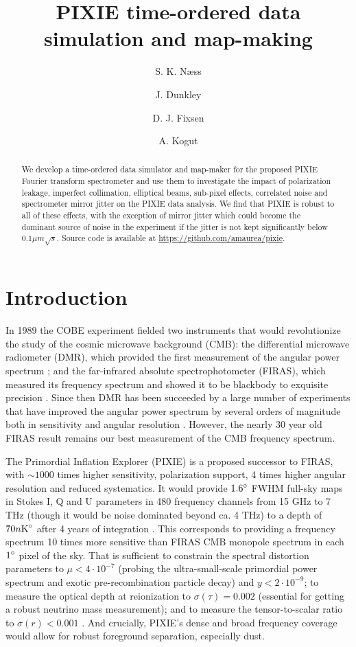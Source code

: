 \documentclass{article}
\title{PIXIE time-ordered data simulation and map-making}
\author[1,2]{S. K. Næss}
\author[2,3]{J. Dunkley}
\author[4,5]{D. J. Fixsen}
\author[5]{A. Kogut}
\affil[1]{Center for Computational Astrophysics, Flatiron Institute}
\affil[2]{Oxford Astrophysics}
\affil[3]{Princeton University}
\affil[4]{University of Maryland}
\affil[5]{Goddard Space Flight Center}
\begin{document}
\maketitle
\begin{abstract}
	We develop a time-ordered data simulator and map-maker for the
	proposed PIXIE Fourier transform spectrometer and use them to
	investigate the impact of polarization leakage, imperfect collimation,
	elliptical beams, sub-pixel effects, correlated noise and
	spectrometer mirror jitter on the PIXIE data analysis. We find
	that PIXIE is robust to all of these effects, with the exception
	of mirror jitter which could become the dominant source of noise
	in the experiment if the jitter is not kept significantly below
	$0.1\mu m\sqrt{s}$. Source code is available at \url{https://github.com/amaurea/pixie}.
\end{abstract}

\section{Introduction}
In 1989 the COBE experiment fielded two instruments that would revolutionize the
study of the cosmic microwave background (CMB): the differential microwave
radiometer (DMR), which provided the first measurement of the angular power
spectrum \citep{cobe-dmr-1992}; and the far-infrared absolute spectrophotometer (FIRAS), which
measured its frequency spectrum and showed it to be blackbody to exquisite
precision \citep{cobe-firas-1996}. Since then DMR has been succeeded by a large number of experiments
that have improved the angular power spectrum by several orders of magnitude
both in sensitivity and angular resolution \citep{bennett/etal/2013, planck_mission/2013, bicep2-planck, act-2017, spt-2017}. However, the nearly 30 year old
FIRAS result remains our best measurement of the CMB frequency spectrum.

The Primordial Inflation Explorer (PIXIE) is a proposed successor to FIRAS,
with $\sim 1000$ times higher sensitivity, polarization support, 4 times
higher angular resolution and reduced systematics.
It would provide $1.6\degree$ FWHM full-sky maps in Stokes I, Q and U parameters
in 480 frequency channels from 15 GHz to 7 THz (though it would be noise dominated
beyond ca. 4 THz) to a depth of $70n\textrm{K}\degree$ after 4 years of integration
\citep{pixie2011}. This corresponds to providing a frequency spectrum 10 times more
sensitive than FIRAS CMB monopole spectrum in each $1\degree$ pixel of the sky.
That is sufficient to constrain the spectral distortion parameters to $\mu < 4\cdot 10^{-7}$
(probing the ultra-small-scale primordial power spectrum and exotic pre-recombination
particle decay) \citep{pixie-forecast} and $y < 2\cdot 10^{-9}$; to measure the optical depth at reionization
to $\sigma(\tau) = 0.002$ (essential for getting a robust neutrino mass measurement);
and to measure the tensor-to-scalar ratio to $\sigma(r) < 0.001$ \citep{pixie-s4}.
And crucially, PIXIE's dense and broad frequency coverage would allow for robust
foreground separation, especially dust.
\end{document}
